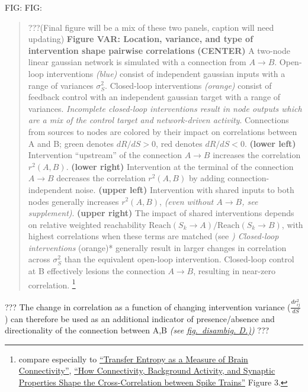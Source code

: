 FIG: %
FIG: %

\begin{quote}
???(Final figure will be a mix of these two panels, caption will need
updating) \textbf{Figure VAR: Location, variance, and type of
intervention shape pairwise correlations} \textbf{(CENTER)} A two-node
linear gaussian network is simulated with a connection from \(A\rightarrow B\).
Open-loop interventions \emph{(blue)} consist of independent gaussian
inputs with a range of variances \(\sigma^2_S\). Closed-loop
interventions \emph{(orange)} consist of feedback control with an
independent gaussian target with a range of variances. \emph{Incomplete
closed-loop interventions result in node outputs which are a mix of the
control target and network-driven activity}. Connections from sources to
nodes are colored by their impact on correlations between A and B; green
denotes \(dR/dS > 0\), red denotes \(dR/dS<0\). \textbf{(lower left)}
Intervention ``upstream'' of the connection \(A\rightarrow B\) increases the
correlation \(r^2(A,B)\). \textbf{(lower right)} Intervention at the
terminal of the connection \(A\rightarrow B\) decreases the correlation
\(r^2(A,B)\) by adding connection-independent noise. \textbf{(upper
left)} Intervention with shared inputs to both nodes generally increases
\(r^2(A,B)\), \emph{(even without \(A\rightarrow B\), see supplement)}.
\textbf{(upper right)} The impact of shared interventions depends on
relative weighted reachability
\(\text{Reach}(S_k\rightarrow A) / \text{Reach}(S_k\rightarrow B)\), with highest correlations
when these terms are matched (see \emph{) Closed-loop interventions
}(orange)* generally result in larger changes in correlation across
\(\sigma^2_S\) than the equivalent open-loop intervention. Closed-loop
control at B effectively lesions the connection \(A\rightarrow B\), resulting in
near-zero correlation. \footnote{compare especially to
  \href{https://www.frontiersin.org/articles/10.3389/fncom.2020.00045/full}{``Transfer
  Entropy as a Measure of Brain Connectivity''},
  \href{https://www.jneurosci.org/content/29/33/10234}{``How
  Connectivity, Background Activity, and Synaptic Properties Shape the
  Cross-Correlation between Spike Trains''} Figure 3.}
\end{quote}

??? The change in correlation as a function of changing intervention
variance (\(\frac{dr^2_{ij}}{dS}\)) can therefore be used as an
additional indicator of presence/absence and directionality of the
connection between A,B \emph{(see \href{fig-disambig}{fig.~disambig.
D.)})} ???

